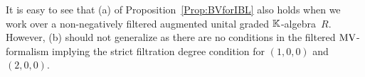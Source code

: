 \documentclass[\MainFolder/Text.tex]{subfiles}
\begin{document}
%
%
%
%
%
%
\begin{Remark}\label{Rem:GenOverAlg}
It is easy to see that (a) of Proposition~\ref{Prop:BVforIBL} also holds when we work over a non-negatively filtered augmented unital graded $\mathbb{K}$-algebra~$R$. However, (b) should not generalize as there are no conditions in the filtered $\mathrm{MV}$-formalism implying the strict filtration degree condition for $(1,0,0)$ and $(2,0,0)$.
\end{Remark}
\end{document}
